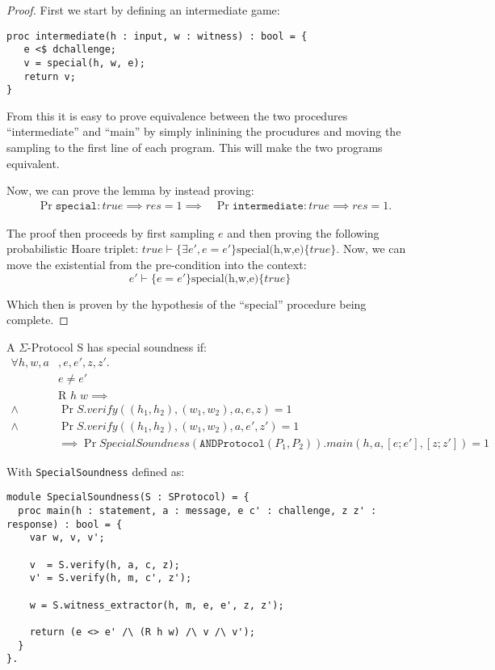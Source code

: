 \begin{proof}
First we start by defining an intermediate game:
\begin{lstlisting}
proc intermediate(h : input, w : witness) : bool = {
   e <$ dchallenge;
   v = special(h, w, e);
   return v;
}
\end{lstlisting}

From this it is easy to prove equivalence between the two procedures
``intermediate'' and ``main'' by simply inlinining the procudures and moving
the sampling to the first line of each program. This will make the two programs
equivalent.

Now, we can prove the lemma by instead proving:
\begin{align*}
  &\Pr{\texttt{special} : true \implies res} = 1 \implies
    &\Pr{\texttt{intermediate} : true \implies res} = 1.
\end{align*}

The proof then proceeds by first sampling $e$ and then proving the following
probabilistic Hoare triplet: $true \vdash \{\exists e', e = e'\}
\text{special(h,w,e)} \{true\}$. Now, we can move the existential
from the pre-condition into the context:
\[
  e' \vdash \{e = e'\} \text{special(h,w,e)} \{true\}
\]

Which then is proven by the hypothesis of the ``special'' procedure being complete.
\end{proof}


\begin{definition}
\label{def:sigma:soundness}
  A $\Sigma$-Protocol S has special soundness if:
\begin{align*}
  \forall h,w,a&,e,e',z,z'. \\
    & e \neq e' \\
    & \text{R } h \; w \implies \\
    \land &\Pr{S.verify((h_{1}, h_{2}), (w_{1}, w_{2}), a,  e, z)} = 1 \\
    \land &\Pr{S.verify((h_{1}, h_{2}), (w_{1}, w_{2}), a, e', z')} = 1 \\
    &\implies \Pr{SpecialSoundness(\texttt{ANDProtocol}(P_{1}, P_{2})).main(h, a, [e;e'], [z;z'])} = 1
\end{align*}

With \texttt{SpecialSoundness} defined as:

\begin{lstlisting}[float, label=lst:sigma-soundness, caption= 2-special soundness game]
module SpecialSoundness(S : SProtocol) = {
  proc main(h : statement, a : message, e c' : challenge, z z' : response) : bool = {
    var w, v, v';

    v  = S.verify(h, a, c, z);
    v' = S.verify(h, m, c', z');

    w = S.witness_extractor(h, m, e, e', z, z');

    return (e <> e' /\ (R h w) /\ v /\ v');
  }
}.
\end{lstlisting}
\end{definition}

